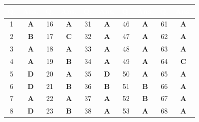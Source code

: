 \documentclass[11pt,a4paper]{article}
\begin{document}
\begin{center}
\renewcommand{\arraystretch}{1.3}
\small
\begin{tabular}{|c|c||c|c||c|c||c|c||c|c|}
\hline
\rowcolor{tableDarkHeader}
\textcolor{white}{\textbf{Q.}} & \textcolor{white}{\textbf{Ans.}} & \textcolor{white}{\textbf{Q.}} & \textcolor{white}{\textbf{Ans.}} & \textcolor{white}{\textbf{Q.}} & \textcolor{white}{\textbf{Ans.}} & \textcolor{white}{\textbf{Q.}} & \textcolor{white}{\textbf{Ans.}} & \textcolor{white}{\textbf{Q.}} & \textcolor{white}{\textbf{Ans.}} \\
\hline\hline
\rowcolor{white}
1 & \textbf{\textcolor{l1Green}{A}} & 16 & \textbf{\textcolor{l1Green}{A}} & 31 & \textbf{\textcolor{l2Amber}{A}} & 46 & \textbf{\textcolor{l2Amber}{A}} & 61 & \textbf{\textcolor{l3Crimson}{A}} \\
\hline
\rowcolor{tableStripe}
2 & \textbf{\textcolor{l1Green}{B}} & 17 & \textbf{\textcolor{l1Green}{C}} & 32 & \textbf{\textcolor{l2Amber}{A}} & 47 & \textbf{\textcolor{l2Amber}{A}} & 62 & \textbf{\textcolor{l3Crimson}{A}} \\
\hline
\rowcolor{white}
3 & \textbf{\textcolor{l1Green}{A}} & 18 & \textbf{\textcolor{l1Green}{A}} & 33 & \textbf{\textcolor{l2Amber}{A}} & 48 & \textbf{\textcolor{l2Amber}{A}} & 63 & \textbf{\textcolor{l3Crimson}{A}} \\
\hline
\rowcolor{tableStripe}
4 & \textbf{\textcolor{l1Green}{A}} & 19 & \textbf{\textcolor{l1Green}{B}} & 34 & \textbf{\textcolor{l2Amber}{A}} & 49 & \textbf{\textcolor{l2Amber}{A}} & 64 & \textbf{\textcolor{l3Crimson}{C}} \\
\hline
\rowcolor{white}
5 & \textbf{\textcolor{l1Green}{D}} & 20 & \textbf{\textcolor{l1Green}{A}} & 35 & \textbf{\textcolor{l2Amber}{D}} & 50 & \textbf{\textcolor{l2Amber}{A}} & 65 & \textbf{\textcolor{l3Crimson}{A}} \\
\hline
\rowcolor{tableStripe}
6 & \textbf{\textcolor{l1Green}{D}} & 21 & \textbf{\textcolor{l1Green}{B}} & 36 & \textbf{\textcolor{l2Amber}{B}} & 51 & \textbf{\textcolor{l3Crimson}{B}} & 66 & \textbf{\textcolor{l3Crimson}{A}} \\
\hline
\rowcolor{white}
7 & \textbf{\textcolor{l1Green}{A}} & 22 & \textbf{\textcolor{l1Green}{A}} & 37 & \textbf{\textcolor{l2Amber}{A}} & 52 & \textbf{\textcolor{l3Crimson}{B}} & 67 & \textbf{\textcolor{l3Crimson}{A}} \\
\hline
\rowcolor{tableStripe}
8 & \textbf{\textcolor{l1Green}{D}} & 23 & \textbf{\textcolor{l1Green}{B}} & 38 & \textbf{\textcolor{l2Amber}{A}} & 53 & \textbf{\textcolor{l3Crimson}{A}} & 68 & \textbf{\textcolor{l3Crimson}{A}} \\

\end{tabular}
\end{center}
\end{document}
